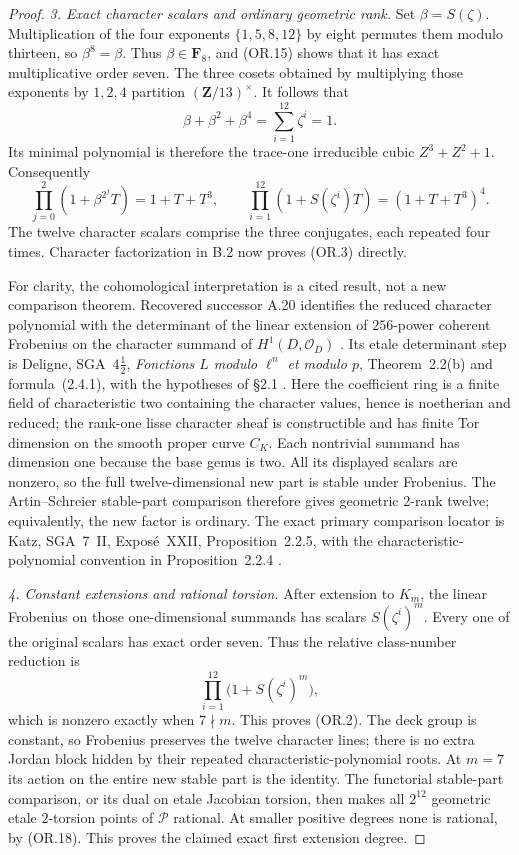 \begin{proof}
\emph{3. Exact character scalars and ordinary geometric rank.}
Set $\beta=S(\zeta)$.  Multiplication of the four exponents
$\{1,5,8,12\}$ by eight permutes them modulo thirteen, so
$\beta^8=\beta$.  Thus $\beta\in\mathbf F_8$, and (OR.15)
shows that it has exact multiplicative order seven.
The three cosets obtained by multiplying those exponents by
$1,2,4$ partition $(\mathbf Z/13)^\times$.  It follows that
\[
              \beta+\beta^2+\beta^4
                        =\sum_{i=1}^{12}\zeta^i=1.
 \tag{OR.16}
\]
Its minimal polynomial is therefore the trace-one irreducible
cubic $Z^3+Z^2+1$.  Consequently
\[
 \prod_{j=0}^{2}(1+\beta^{2^j}T)=1+T+T^3,
 \qquad
 \prod_{i=1}^{12}(1+S(\zeta^i)T)=(1+T+T^3)^4.
 \tag{OR.17}
\]
The twelve character scalars comprise the three conjugates,
each repeated four times.  Character factorization in B.2
now proves (OR.3) directly.

For clarity, the cohomological interpretation is a cited result,
not a new comparison theorem.  Recovered successor A.20 identifies
the reduced character polynomial with the determinant of the
linear extension of $256$-power coherent Frobenius on the
character summand of $H^1(D,\mathcal O_D)$
\cite[A.20]{ASrun}.  Its etale determinant step is Deligne,
SGA~$4\frac12$, \emph{Fonctions $L$ modulo $\ell^n$ et modulo
$p$}, Theorem~2.2(b) and formula~(2.4.1), with the hypotheses
of \S2.1 \cite{DeligneModP}.  Here the coefficient ring is a
finite field of characteristic two containing the character
values, hence is noetherian and reduced; the rank-one lisse
character sheaf is constructible and has finite Tor dimension
on the smooth proper curve $C_K$.  Each nontrivial summand has dimension one
because the base genus is two.  All its displayed scalars are
nonzero, so the full twelve-dimensional new part is stable under
Frobenius.  The Artin--Schreier stable-part comparison therefore
gives geometric $2$-rank twelve; equivalently, the new factor is
ordinary.  The exact primary comparison locator is Katz,
SGA~7~II, Expos\'e~XXII, Proposition~2.2.5, with the
characteristic-polynomial convention in Proposition~2.2.4
\cite{KatzCongruence}.

\emph{4. Constant extensions and rational torsion.}
After extension to $K_m$, the linear Frobenius on those
one-dimensional summands has scalars $S(\zeta^i)^m$.
Every one of the original scalars has exact order seven.
Thus the relative class-number reduction is
\[
        \prod_{i=1}^{12}\bigl(1+S(\zeta^i)^m\bigr),
 \tag{OR.18}
\]
which is nonzero exactly when $7\nmid m$.  This proves (OR.2).
The deck group is constant, so Frobenius preserves the twelve
character lines; there is no extra Jordan block hidden by their
repeated characteristic-polynomial roots.  At $m=7$ its action
on the entire new stable part is the identity.  The functorial
stable-part comparison, or its dual on etale Jacobian torsion,
then makes all $2^{12}$ geometric etale $2$-torsion points of
$\mathcal P$ rational.  At smaller positive degrees none is
rational, by (OR.18).  This proves the claimed exact first
extension degree.
\end{proof}


